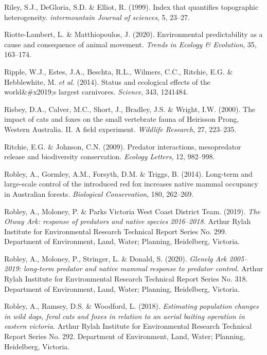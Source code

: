 \documentclass[11pt,a4paper,titlepage,twoside,openright]{style/unimelbthesis}
\begin{document}
\begin{mainmatter}
\leavevmode\hypertarget{ref-riley1999index}{}%
Riley, S.J., DeGloria, S.D. \& Elliot, R. (1999). Index that quantifies topographic heterogeneity. \emph{intermountain Journal of sciences}, 5, 23--27.

\leavevmode\hypertarget{ref-riotte-lambert2020environmental}{}%
Riotte-Lambert, L. \& Matthiopoulos, J. (2020). Environmental predictability as a cause and consequence of animal movement. \emph{Trends in Ecology \& Evolution}, 35, 163--174.

\leavevmode\hypertarget{ref-ripple2014status}{}%
Ripple, W.J., Estes, J.A., Beschta, R.L., Wilmers, C.C., Ritchie, E.G. \& Hebblewhite, M. \emph{et al.} (2014). Status and ecological effects of the world\&\#x2019;s largest carnivores. \emph{Science}, 343, 1241484.

\leavevmode\hypertarget{ref-risbey2000impacts}{}%
Risbey, D.A., Calver, M.C., Short, J., Bradley, J.S. \& Wright, I.W. (2000). The impact of cats and foxes on the small vertebrate fauna of Heirisson Prong, Western Australia. II. A field experiment. \emph{Wildlife Research}, 27, 223--235.

\leavevmode\hypertarget{ref-ritchie2009predator}{}%
Ritchie, E.G. \& Johnson, C.N. (2009). Predator interactions, mesopredator release and biodiversity conservation. \emph{Ecology Letters}, 12, 982--998.

\leavevmode\hypertarget{ref-robley2014long}{}%
Robley, A., Gormley, A.M., Forsyth, D.M. \& Triggs, B. (2014). Long-term and large-scale control of the introduced red fox increases native mammal occupancy in Australian forests. \emph{Biological Conservation}, 180, 262--269.

\leavevmode\hypertarget{ref-robley2019otway}{}%
Robley, A., Moloney, P. \& Parks Victoria West Coast District Team. (2019). \emph{The Otway Ark: response of predators and native species 2016--2018.} Arthur Rylah Institute for Environmental Research Technical Report Series No. 299. Department of Environment, Land, Water; Planning, Heidelberg, Victoria.

\leavevmode\hypertarget{ref-robley2020glenelg}{}%
Robley, A., Moloney, P., Stringer, L. \& Donald, S. (2020). \emph{Glenelg Ark 2005--2019: long-term predator and native mammal response to predator control.} Arthur Rylah Institute for Environmental Research Technical Report Series No. 318. Department of Environment, Land, Water; Planning, Heidelberg, Victoria.

\leavevmode\hypertarget{ref-robley2018estimating}{}%
Robley, A., Ramsey, D.S. \& Woodford, L. (2018). \emph{Estimating population changes in wild dogs, feral cats and foxes in relation to an aerial baiting operation in eastern victoria.} Arthur Rylah Institute for Environmental Research Technical Report Series No. 292. Department of Environment, Land, Water; Planning, Heidelberg, Victoria.


\end{mainmatter}
\end{document}
